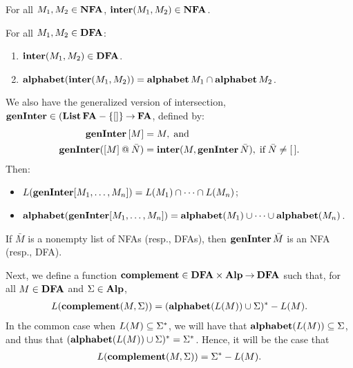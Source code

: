 %
%
%
\begin{proposition}
For all $M_1,M_2\in\mathbf{NFA}$, $\mathbf{inter}(M_1,M_2)\in\mathbf{NFA}$.
\end{proposition}

%
%
%
\begin{proposition}
For all $M_1,M_2\in\mathbf{DFA}$:
\begin{enumerate}[\quad(1)]
\item $\mathbf{inter}(M_1,M_2)\in\mathbf{DFA}$.

\item $\mathbf{alphabet}(\mathbf{inter}(M_1,M_2)) = \mathbf{alphabet}\,M_1\cap\mathbf{alphabet}\,M_2$.
\end{enumerate}
\end{proposition}

We also have the generalized version of intersection,
$\mathbf{genInter}\in(\mathbf{List}\,\mathbf{FA} - \{[]\}\mathbin{\to}\mathbf{FA}$,
 defined by:
\begin{align*}
\mathbf{genInter}\,[M] &= M , \;\allowbreak\mbox{and}\allowbreak\; \\
\mathbf{genInter}([M] \mathbin{@} \bar{N}) &=
\mathbf{inter}(M, \mathbf{genInter}\,\bar{N}), \;\allowbreak\mbox{if}\allowbreak\; \bar{N}\neq [\,].
\end{align*}
Then:
\begin{itemize}
\item $L(\mathbf{genInter} [M_1,\ldots,M_n]) = L(M_1)\cap\cdots\cap L(M_n)$;
\item
  $\mathbf{alphabet}(\mathbf{genInter} [M_1,\ldots,M_n]) =
  \mathbf{alphabet}(M_1)\cup\cdots\cup \mathbf{alphabet}(M_n)$.
\end{itemize}
If $\bar{M}$ is a nonempty list of NFAs (resp., DFAs), then
$\mathbf{genInter}\,\bar{M}$ is an NFA (resp., DFA).

%
%
%
Next, we define a function $\mathbf{complement}\in\mathbf{DFA}\times\mathbf{Alp}\mathbin{\to}\mathbf{DFA}$
such that, for all $M\in\mathbf{DFA}$ and $\Sigma\in\mathbf{Alp}$,
\begin{gather*}
L(\mathbf{complement}(M,\Sigma)) = (\mathbf{alphabet}(L(M))\cup\Sigma)^*-L(M) .
\end{gather*}
In the common case when $L(M)\subseteq\Sigma^*$, we will have that
$\mathbf{alphabet}(L(M))\subseteq\Sigma$, and thus that
$(\mathbf{alphabet}(L(M))\cup\Sigma)^*=\Sigma^*$.  Hence, it will be the case
that
\begin{gather*}
L(\mathbf{complement}(M,\Sigma)) = \Sigma^*-L(M) .
\end{gather*}

